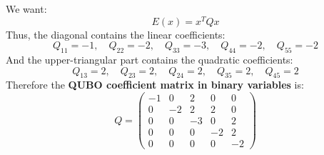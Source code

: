 \highspace
{} We want:
\begin{equation*}
    E(x) = x^{T} Q x
\end{equation*}
Thus, the diagonal contains the linear coefficients:
\begin{equation*}
    Q_{11} = -1, \quad
    Q_{22} = -2, \quad
    Q_{33} = -3, \quad
    Q_{44} = -2, \quad
    Q_{55} = -2
\end{equation*}
And the upper-triangular part contains the quadratic coefficients:
\begin{equation*}
    Q_{13} = 2, \quad
    Q_{23} = 2, \quad
    Q_{24} = 2, \quad
    Q_{35} = 2, \quad
    Q_{45} = 2
\end{equation*}
Therefore the \textbf{QUBO coefficient matrix in binary variables} is:
\begin{equation*}
    \boxed{Q =
        \begin{pmatrix}
            -1 & 0 & 2 & 0 & 0 \\
            0 & -2 & 2 & 2 & 0 \\
            0 & 0 & -3 & 0 & 2 \\
            0 & 0 & 0 & -2 & 2 \\
            0 & 0 & 0 & 0 & -2
    \end{pmatrix}}
\end{equation*}

